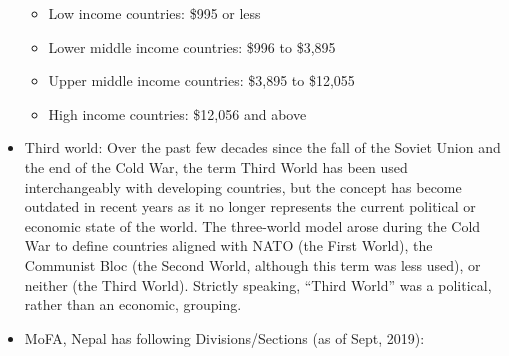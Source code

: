 \documentclass[]{book}
\providecommand{\tightlist}{%
  \setlength{\itemsep}{0pt}\setlength{\parskip}{0pt}}
\begin{document}
\begin{itemize}
  \begin{itemize}
  \tightlist
  \item
    Low income countries: \$995 or less
  \item
    Lower middle income countries: \$996 to \$3,895
  \item
    Upper middle income countries: \$3,895 to \$12,055
  \item
    High income countries: \$12,056 and above
  \end{itemize}
\item
  Third world:
  Over the past few decades since the fall of the Soviet Union and the end of the Cold War, the term Third World has been used interchangeably with developing countries, but the concept has become outdated in recent years as it no longer represents the current political or economic state of the world. The three-world model arose during the Cold War to define countries aligned with NATO (the First World), the Communist Bloc (the Second World, although this term was less used), or neither (the Third World). Strictly speaking, ``Third World'' was a political, rather than an economic, grouping.
\item
  MoFA, Nepal has following Divisions/Sections (as of Sept, 2019):


\end{itemize}
\end{document}
